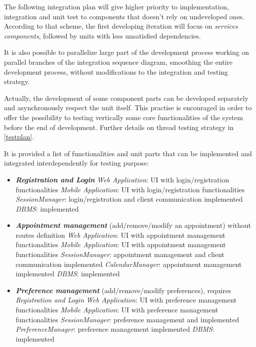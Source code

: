 The following integration plan will give higher priority to implementation, integration and unit test to components that doesn't rely on undeveloped ones.
According to that scheme, the first developing iteration will focus on \textit{services components}, followed by units with less unsatisfied dependencies.

It is also possible to parallelize large part of the development process working on parallel branches of the integration sequence diagram, smoothing the entire development process, without modifications to the integration and testing strategy.

Actually, the development of some component parts can be developed separately and asynchronously respect the unit itself. This practise is encouraged in order to offer the possibility to testing vertically some core functionalities of the system before the end of development. Further details on thread testing strategy in \ref{testplan}.

It is provided a list of functionalities and unit parts that can be implemented and integrated interdependently for testing purpose:
\begin{itemize}
	\item \textbf{\textit{Registration and Login}}
	\subitem \textit{Web Application}: UI with login/registration functionalities
	\subitem \textit{Mobile Application}: UI with login/registration functionalities
	\subitem \textit{SessionManager}: login/registration and client communication implemented
	\subitem \textit{DBMS}: implemented
	
	\item \textbf{\textit{Appointment management}} (add/remove/modify an appointment) without routes definition
	\subitem \textit{Web Application}: UI with appointment management functionalities
	\subitem \textit{Mobile Application}: UI with appointment management functionalities
	\subitem \textit{SessionManager}: appointment management and client communication implemented
	\subitem \textit{CalendarManager}: appointment management implemented
	\subitem \textit{DBMS}: implemented
	
	\item \textbf{\textit{Preference management}} (add/remove/modify preferences), requires \textit{Registration and Login}
	\subitem \textit{Web Application}: UI with preference management functionalities
	\subitem \textit{Mobile Application}: UI with preference management functionalities
	\subitem \textit{SessionManager}: preference management and implemented
	\subitem \textit{PreferenceManager}: preference management implemented
	\subitem \textit{DBMS}: implemented
\end{itemize}

